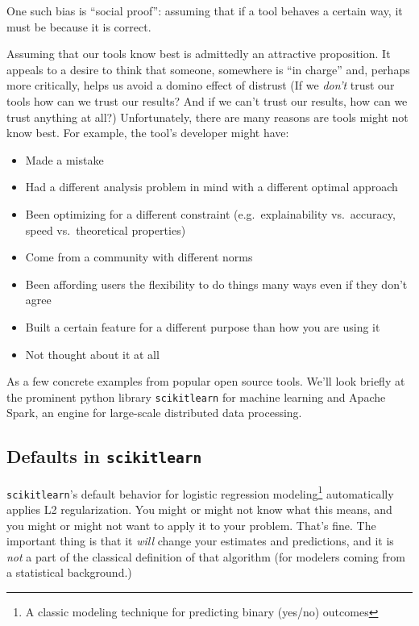 \documentclass[
]{krantz}
\providecommand{\tightlist}{%
  \setlength{\itemsep}{0pt}\setlength{\parskip}{0pt}}
\begin{document}
One such bias is ``social proof'': assuming that if a tool behaves a certain way, it must be because it is correct.

Assuming that our tools know best is admittedly an attractive proposition. It appeals to a desire to think that someone, somewhere is ``in charge'' and, perhaps more critically, helps us avoid a domino effect of distrust (If we \emph{don't} trust our tools how can we trust our results? And if we can't trust our results, how can we trust anything at all?) Unfortunately, there are many reasons are tools might not know best. For example, the tool's developer might have:

\begin{itemize}
\tightlist
\item
  Made a mistake
\item
  Had a different analysis problem in mind with a different optimal approach
\item
  Been optimizing for a different constraint (e.g.~explainability vs.~accuracy, speed vs.~theoretical properties)
\item
  Come from a community with different norms
\item
  Been affording users the flexibility to do things many ways even if they don't agree
\item
  Built a certain feature for a different purpose than how you are using it
\item
  Not thought about it at all
\end{itemize}

As a few concrete examples from popular open source tools. We'll look briefly at the prominent python library \texttt{scikitlearn} for machine learning and Apache Spark, an engine for large-scale distributed data processing.

\hypertarget{defaults-in-scikitlearn}{%
\subsection{\texorpdfstring{Defaults in \texttt{scikitlearn}}{Defaults in scikitlearn}}\label{defaults-in-scikitlearn}}

\texttt{scikitlearn}'s default behavior for logistic regression modeling\footnote{A classic modeling technique for predicting binary (yes/no) outcomes} automatically applies L2 regularization. You might or might not know what this means, and you might or might not want to apply it to your problem. That's fine. The important thing is that it \emph{will} change your estimates and predictions, and it is \emph{not} a part of the classical definition of that algorithm (for modelers coming from a statistical background.)
\end{document}
